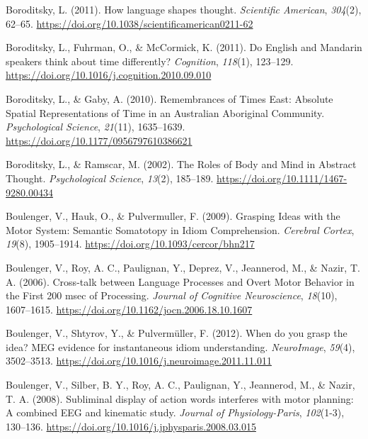\documentclass[
  a4paper,12pt,twoside,onecolumn,openright,final,oldfontcommands]{memoir}
\newlength{\cslhangindent}
\newlength{\cslentryspacingunit} %
\newenvironment{CSLReferences}[2] %
 {%
  \setlength{\parindent}{0pt}
  \ifodd #1
  \let\oldpar\par
  \def\par{\hangindent=\cslhangindent\oldpar}
  \fi
  \setlength{\parskip}{#2\cslentryspacingunit}
 }%
 {}
\begin{document}
\begin{CSLReferences}{1}{0}
\leavevmode{}%
Boroditsky, L. (2011). How language shapes thought. \emph{Scientific American}, \emph{304}(2), 62--65. \url{https://doi.org/10.1038/scientificamerican0211-62}

\leavevmode{}%
Boroditsky, L., Fuhrman, O., \& McCormick, K. (2011). Do {English} and {Mandarin} speakers think about time differently? \emph{Cognition}, \emph{118}(1), 123--129. \url{https://doi.org/10.1016/j.cognition.2010.09.010}

\leavevmode{}%
Boroditsky, L., \& Gaby, A. (2010). Remembrances of {Times} {East}: {Absolute} {Spatial} {Representations} of {Time} in an {Australian} {Aboriginal} {Community}. \emph{Psychological Science}, \emph{21}(11), 1635--1639. \url{https://doi.org/10.1177/0956797610386621}

\leavevmode{}%
Boroditsky, L., \& Ramscar, M. (2002). The {Roles} of {Body} and {Mind} in {Abstract} {Thought}. \emph{Psychological Science}, \emph{13}(2), 185--189. \url{https://doi.org/10.1111/1467-9280.00434}

\leavevmode{}%
Boulenger, V., Hauk, O., \& Pulvermuller, F. (2009). Grasping {Ideas} with the {Motor} {System}: {Semantic} {Somatotopy} in {Idiom} {Comprehension}. \emph{Cerebral Cortex}, \emph{19}(8), 1905--1914. \url{https://doi.org/10.1093/cercor/bhn217}

\leavevmode{}%
Boulenger, V., Roy, A. C., Paulignan, Y., Deprez, V., Jeannerod, M., \& Nazir, T. A. (2006). Cross-talk between {Language} {Processes} and {Overt} {Motor} {Behavior} in the {First} 200 msec of {Processing}. \emph{Journal of Cognitive Neuroscience}, \emph{18}(10), 1607--1615. \url{https://doi.org/10.1162/jocn.2006.18.10.1607}

\leavevmode{}%
Boulenger, V., Shtyrov, Y., \& Pulvermüller, F. (2012). When do you grasp the idea? {MEG} evidence for instantaneous idiom understanding. \emph{NeuroImage}, \emph{59}(4), 3502--3513. \url{https://doi.org/10.1016/j.neuroimage.2011.11.011}

\leavevmode{}%
Boulenger, V., Silber, B. Y., Roy, A. C., Paulignan, Y., Jeannerod, M., \& Nazir, T. A. (2008). Subliminal display of action words interferes with motor planning: {A} combined {EEG} and kinematic study. \emph{Journal of Physiology-Paris}, \emph{102}(1-3), 130--136. \url{https://doi.org/10.1016/j.jphysparis.2008.03.015}


\end{CSLReferences}
\end{document}
